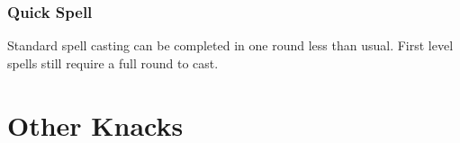 \begin{multicols}{2}
\subsubsection{Quick Spell}

\iftoggle{verbose}{
	The character is particularly adept at casting spells quickly, and therefore in Combat.
	Quick spells cost 2 + their level in Initiative, so a 4th level spell would cost 6 rather than the usual 7 Initiative.
}{
	Quick spells cost 2 + their level in initiative to cast.
}
Standard spell casting can be completed in one round less than usual.
\iftoggle{verbose}{%
	So a second level spell can be cast in 1 round.
}{}%
First level spells still require a full round to cast.


\end{multicols}

\section{Other Knacks}

